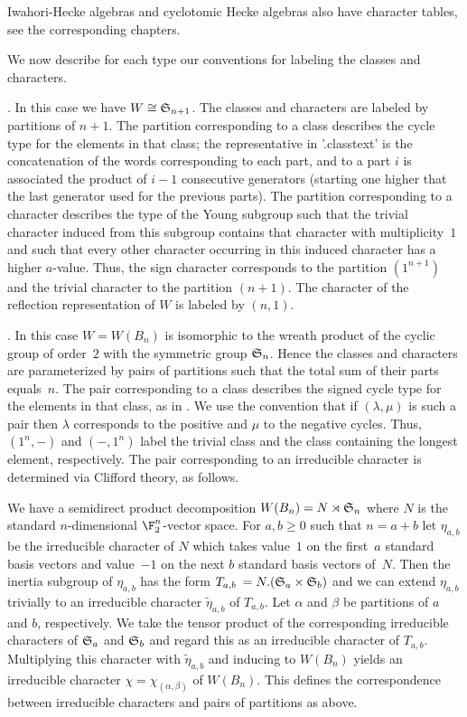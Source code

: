 Iwahori-Hecke  algebras and  cyclotomic Hecke  algebras also have character
tables, see the corresponding chapters.

We  now describe for each type our conventions for labeling the classes and
characters.

\smallskip
{}.  In this  case we  have $W \cong
{\mathfrak S}_{n+1}$. The classes and characters are labeled by partitions of $n+1$.
The  partition corresponding  to a  class describes  the cycle type for the
elements   in  that  class;  the  representative  in  '.classtext'  is  the
concatenation of the words corresponding to each part, and to a part $i$ is
associated the product of $i-1$ consecutive generators (starting one higher
that  the  last  generator  used  for  the  previous  parts). The partition
corresponding  to a character describes the type of the Young subgroup such
that  the  trivial  character  induced  from  this  subgroup  contains that
character  with  multiplicity~$1$  and  such  that  every  other  character
occurring  in this induced character has a higher $a$-value. Thus, the sign
character   corresponds  to  the  partition  $(1^{n+1})$  and  the  trivial
character  to  the  partition  $(n+1)$.  The  character  of  the reflection
representation of $W$ is labeled by $(n,1)$.

\medskip
{}.  In  this  case $W=W(B_n)$ is
isomorphic  to the wreath product of the cyclic group of order~$2$ with the
symmetric   group   ${\mathfrak S}_n$.   Hence   the   classes  and  characters  are
parameterized by pairs of partitions such that the total sum of their parts
equals~$n$.  The pair corresponding  to a class  describes the signed cycle
type  for  the  elements  in  that  class,  as  in \cite{Car72}. We use the
convention   that  if  $(\lambda,\mu)$  is   such  a  pair  then  $\lambda$
corresponds  to  the  positive  and  $\mu$  to  the  negative cycles. Thus,
$(1^n,-)$  and $(-,1^n)$ label  the trivial class  and the class containing
the longest element, respectively. The pair corresponding to an irreducible
character is determined via Clifford theory, as follows.

We  have a  semidirect product  decomposition $W(B_n)=N\rtimes{\mathfrak S}_n$ where
$N$  is the standard $n$-dimensional $\F_2^n$-vector space. For $a,b \ge 0$
such  that $n=a+b$  let $\eta_{a,b}$  be the  irreducible character  of $N$
which   takes  value~$1$  on  the  first~$a$  standard  basis  vectors  and
value~$-1$  on the next $b$ standard basis vectors of~$N$. Then the inertia
subgroup  of $\eta_{a,b}$ has the form $T_{a,b}\:=N.({\mathfrak S}_a \times {\mathfrak S}_b)$
and  we  can  extend  $\eta_{a,b}$  trivially  to  an irreducible character
$\tilde\eta_{a,b}$  of $T_{a,b}$. Let $\alpha$ and $\beta$ be partitions of
$a$  and $b$, respectively. We take the tensor product of the corresponding
irreducible  characters  of  ${\mathfrak S}_a$  and  ${\mathfrak S}_b$  and regard this as an
irreducible   character  of  $T_{a,b}$.  Multiplying  this  character  with
$\tilde\eta_{a,b}$ and inducing to $W(B_n)$ yields an irreducible character
$\chi=  \chi_{(\alpha,\beta)}$ of $W(B_n)$. This defines the correspondence
between irreducible characters and pairs of partitions as above.

